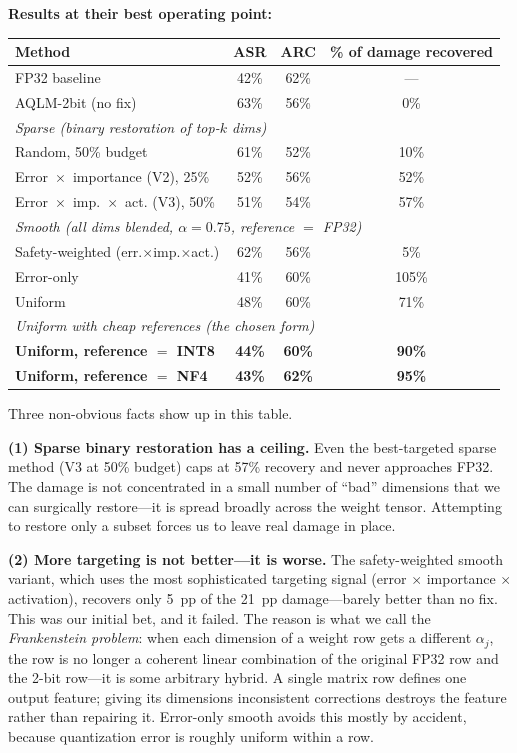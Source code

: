 \documentclass[11pt]{article}
\begin{document}
\textbf{Results at their best operating point:}

\begin{center}
\small
\begin{tabular}{lccc}
\toprule
\textbf{Method} & \textbf{ASR} & \textbf{ARC} & \textbf{\% of damage recovered} \\
\midrule
FP32 baseline & 42\% & 62\% & --- \\
AQLM-2bit (no fix) & 63\% & 56\% & 0\% \\
\midrule
\multicolumn{4}{l}{\emph{Sparse (binary restoration of top-$k$ dims)}}\\
Random, 50\% budget & 61\% & 52\% & 10\% \\
Error~$\times$~importance (V2), 25\% & 52\% & 56\% & 52\% \\
Error~$\times$~imp.~$\times$~act. (V3), 50\% & 51\% & 54\% & 57\% \\
\midrule
\multicolumn{4}{l}{\emph{Smooth (all dims blended, $\alpha = 0.75$, reference $=$ FP32)}}\\
Safety-weighted (err.$\times$imp.$\times$act.) & 62\% & 56\% & 5\% \\
Error-only & 41\% & 60\% & 105\% \\
Uniform & 48\% & 60\% & 71\% \\
\midrule
\multicolumn{4}{l}{\emph{Uniform with cheap references (the chosen form)}}\\
\textbf{Uniform, reference $=$ INT8} & \textbf{44\%} & \textbf{60\%} & \textbf{90\%} \\
\textbf{Uniform, reference $=$ NF4} & \textbf{43\%} & \textbf{62\%} & \textbf{95\%} \\
\bottomrule
\end{tabular}
\end{center}

Three non-obvious facts show up in this table.

\textbf{(1) Sparse binary restoration has a ceiling.} Even the best-targeted sparse method (V3 at 50\% budget) caps at 57\% recovery and never approaches FP32. The damage is not concentrated in a small number of ``bad'' dimensions that we can surgically restore---it is spread broadly across the weight tensor. Attempting to restore only a subset forces us to leave real damage in place.

\textbf{(2) More targeting is not better---it is worse.} The safety-weighted smooth variant, which uses the most sophisticated targeting signal (error $\times$ importance $\times$ activation), recovers only 5~pp of the 21~pp damage---barely better than no fix. This was our initial bet, and it failed. The reason is what we call the \emph{Frankenstein problem}: when each dimension of a weight row gets a different $\alpha_j$, the row is no longer a coherent linear combination of the original FP32 row and the 2-bit row---it is some arbitrary hybrid. A single matrix row defines one output feature; giving its dimensions inconsistent corrections destroys the feature rather than repairing it. Error-only smooth avoids this mostly by accident, because quantization error is roughly uniform within a row.
\end{document}
